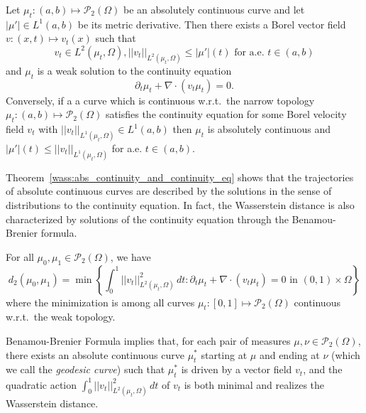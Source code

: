 \begin{theorem}\label{wass:abs_continuity_and_continuity_eq}
    Let $\mu_t : (a,b) \mapsto \mathcal{P}_2(\Omega)$ be an absolutely continuous
    curve and let $|\mu'| \in L^1(a,b)$ be its metric derivative.
    Then there exists a Borel vector field $v : (x,t) \mapsto v_t(x)$ such that
    \begin{equation}
        v_t \in L^2(\mu_t, \Omega), ||v_t||_{L^2(\mu_t, \Omega)} \leq |\mu'|(t)\text{ for a.e. } t \in (a,b)
    \end{equation}
    and $\mu_t$ is a weak solution to the continuity equation
    \begin{equation}
        \partial_t \mu_t + \nabla \cdot (v_t \mu_t) = 0.
    \end{equation}
    Conversely, if a a curve which is continuous w.r.t.~the narrow topology
    $\mu_t : (a,b) \mapsto \mathcal{P}_2(\Omega)$
    satisfies the continuity equation for some Borel velocity field $v_t$ with
    $||v_t||_{L^1(\mu_t, \Omega)} \in L^1(a,b)$ then $\mu_t$ is absolutely continuous
    and $ |\mu'|(t) \leq  ||v_t||_{L^1(\mu_t, \Omega)}$ for a.e. $t \in (a,b)$.
\end{theorem}

Theorem~\ref{wass:abs_continuity_and_continuity_eq} shows that the trajectories of absolute continuous curves are described
by the solutions in the sense of distributions to the continuity equation. In fact, the Wasserstein distance is also characterized
by solutions of the continuity equation through the Benamou-Brenier formula.

\begin{theorem}
    For all  $\mu_0, \mu_1 \in \mathcal{P}_2(\Omega)$, we have
    \begin{equation}
        d_2(\mu_0, \mu_1) = \min \left\{ \int_0^1 ||v_t||^2_{L^2(\mu_t, \Omega)} \, dt : \partial_t \mu_t + \nabla \cdot (v_t \mu_t) = 0 \text{ in } (0,1) \times \Omega \right\}
    \end{equation} 
    where the minimization is among all curves $\mu_t : [0,1] \mapsto \mathcal{P}_2(\Omega)$
    continuous w.r.t.~the weak topology.
\end{theorem}

Benamou-Brenier Formula implies that,
for each pair of measures $\mu, \nu \in \mathcal{P}_2(\Omega)$,
there exists an absolute continuous curve $\mu^*_t$ starting at $\mu$ and ending at $\nu$ 
(which we call the \textit{geodesic curve})
such that $\mu^*_t$ is driven by a vector field $v_t$, and the quadratic action
$\int_0^1 ||v_t||^2_{L^2(\mu_t, \Omega)} \, dt$ of $v_t$
is both minimal and realizes the Wasserstein distance.

